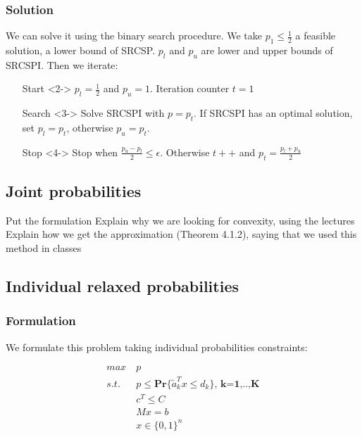 \documentclass{beamer}
\begin{document}
\subsubsection{Solution}
\begin{frame}
We can solve it using the binary search procedure. We take $p_1 \leq \frac{1}{2}$ a feasible solution, a lower bound of SRCSP. $p_l$ and $p_u$ are lower and upper bounds of SRCSPI. Then we iterate:

\begin{itemize}
\item[Start]<2-> $p_l = \frac{1}{2}$ and $p_u = 1$. Iteration counter $t = 1$
\item[Search]<3-> Solve SRCSPI with $p = p_t$. If SRCSPI has an optimal solution, set $p_l = p_t$, otherwise $p_u = p_t$.
\item[Stop]<4-> Stop when $\frac{p_u - p_l}{2} \leq \epsilon$. Otherwise $t++$ and $p_t = \frac{p_l + p_u}{2} $
\end{itemize}

\end{frame}

\subsection{Joint probabilities}
\begin{frame}
Put the formulation
Explain why we are looking for convexity, using the lectures
Explain how we get the approximation (Theorem 4.1.2), saying that we used this method in classes

\end{frame}

\subsection{Individual relaxed probabilities}
\subsubsection{Formulation}
\begin{frame}
	We formulate this problem taking individual probabilities constraints:
	
\begin{align*}
 max\ & p\\
 s.t.\ & p \leq \mathbf{Pr} \{ \tilde{a}_k^Tx \leq d_k \}\textbf{,\ k=1,..,K} \\
 & c^T \leq C \\
 & Mx = b \\
 & x \in \{0, 1\}^n
\end{align*}
\end{frame}
\end{document}
